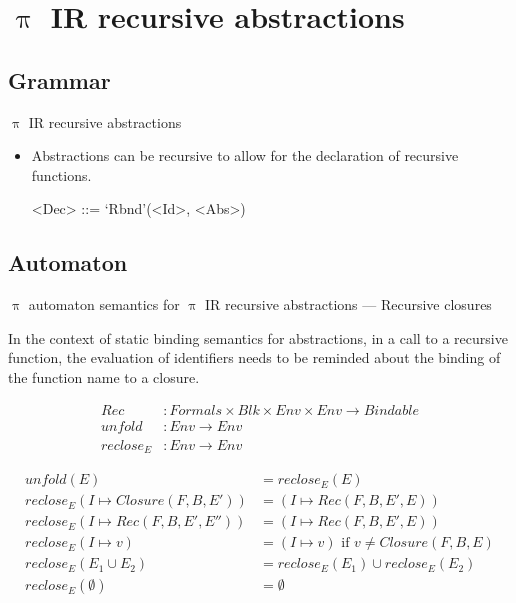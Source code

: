 \documentclass{beamer}
\begin{document}
\section{$\uppi$ IR recursive abstractions}

\subsection{Grammar}


\begin{frame}{{\color{red}$\uppi$ IR} recursive abstractions}

\begin{itemize}

\item Abstractions can be recursive to allow for the declaration of recursive functions.

\begin{grammar}
<Dec>       ::= `Rbnd'(<Id>, <Abs>) 
\end{grammar}
\end{itemize}

\end{frame}

\subsection{Automaton}


\begin{frame}{{\color{red}$\uppi$ automaton} semantics for {\color{red}$\uppi$ IR} recursive abstractions --- Recursive closures}

In the context of static binding semantics for abstractions, in a call to a recursive function, the evaluation of identifiers needs to be reminded about the binding of the function name to a closure.  

\begin{align*}
\mathit{Rec} &: \mathit{Formals} \times \mathit{Blk} \times \mathit{Env}  \times \mathit{Env} \to \mathit{Bindable} \\
\mathit{unfold} &: \mathit{Env} \to \mathit{Env} \\
\mathit{reclose}_E &: \mathit{Env} \to \mathit{Env} 
\end{align*}

\begin{align}
unfold(E) &= reclose_E(E) \\ 
reclose_E(I \mapsto Closure(F, B, E')) &= (I \mapsto Rec(F, B, E', E)) \\ 
reclose_E(I \mapsto Rec(F, B, E',E'')) & = (I\mapsto Rec(F, B, E', E)) \\ 
reclose_E(I\mapsto v) & = (I\mapsto v) \text{ if } v \not= Closure(F, B, E) \\
reclose_E(E_1\cup E_2) & = reclose_E(E_1) \cup reclose_E(E_2) \\ 
reclose_E(\emptyset) & = \emptyset
\end{align}

\end{frame}
\end{document}

